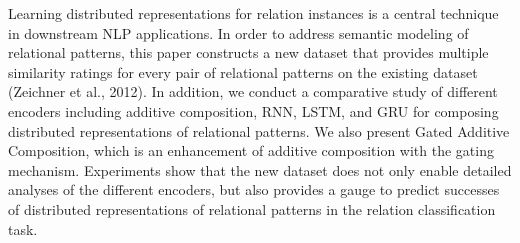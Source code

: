 Learning distributed representations for relation instances is a central technique in downstream NLP applications. In order to address semantic modeling of relational patterns, this paper constructs a new dataset that provides multiple similarity ratings for every pair of relational patterns on the existing dataset (Zeichner et al., 2012). In addition, we conduct a comparative study of different encoders including additive composition, RNN, LSTM, and GRU for composing distributed representations of relational patterns. We also present Gated Additive Composition, which is an enhancement of additive composition with the gating mechanism. Experiments show that the new dataset does not only enable detailed analyses of the different encoders, but also provides a gauge to predict successes of distributed representations of relational patterns in the relation classification task.
